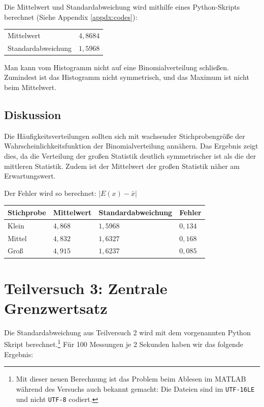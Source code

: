 \documentclass[twoside]{article}
\begin{document}
        Die Mittelwert und Standardabweichung wird mithilfe eines Python-Skripts berechnet (Siehe Appendix \ref{appdx:codes}):
         \begin{center}
            \begin{tabular}{l l}
                \toprule
                Mittelwert & $4,8684$ \\
                Standardabweichung & $1,5968$ \\
                \bottomrule
            \end{tabular}
        \end{center}
        
         Man kann vom Histogramm nicht auf eine Binomialverteilung schließen. Zumindest ist das Histogramm nicht symmetrisch, und das Maximum ist nicht beim Mittelwert.
        
    \subsection*{Diskussion}
        Die Häufigkeits\-verteilungen sollten sich mit wachsender Stichprobengröße der Wahrscheinlichkeitsfunktion der Binomial\-verteilung annähern. Das Ergebnis zeigt dies, da die Verteilung der großen Statistik deutlich symmetrischer ist als die der mittleren Statistik. Zudem ist der Mittelwert der großen Statistik näher am Erwartungswert.
        
        Der Fehler wird so berechnet: $\lvert E(x) - \bar{x} \rvert$

        \begin{center}
            \begin{tabular}{l | l l l}
                \toprule
                Stichprobe & Mittelwert & Standardabweichung & Fehler \\
                \midrule
                Klein & $4,868$ & $1,5968$ & $0,134$ \\
                Mittel & $4,832$ & $1,6327$ & $0,168$ \\
                Groß & $4,915$ & $1,6237$ & $0,085$ \\
                \bottomrule
            \end{tabular}
        \end{center}

\pagebreak
\section*{Teilversuch 3: Zentrale Grenzwertsatz}
    Die Standardabweichung aus Teilversuch 2 wird mit dem vorgenannten Python Skript berechnet.\footnote{Mit dieser neuen Berechnung ist das Problem beim Ablesen im MATLAB während des Versuchs auch bekannt gemacht: Die Dateien sind im \texttt{UTF-16LE} und nicht \texttt{UTF-8} codiert.} Für 100 Messungen je 2 Sekunden haben wir das folgende Ergebnis:
    
\end{document}
